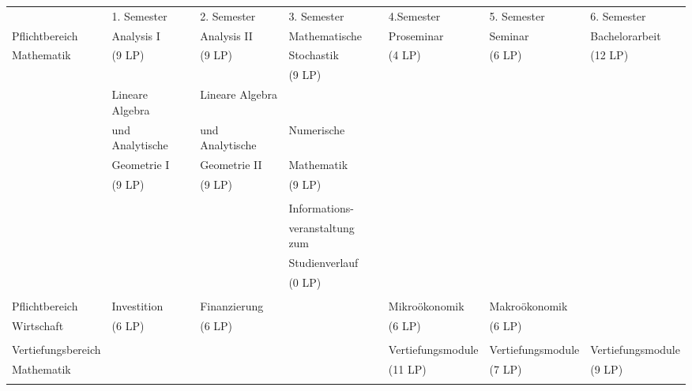 \begin{center}
\begin{tabular}{||l||l|l|l|l|l|l||}
\hhline{|t:=:t:=t=t=t=t=t=:t|}
\hspace*{25mm}&1. Semester\hspace*{8ex}&2. Semester\hspace*{8ex}&3. Semester\hspace*{8ex}&4.Semester\hspace*{8ex}&5. Semester\hspace*{8ex}&6. Semester\hspace*{8ex}\\
\hhline{|:=::======:|} Pflichtbereich&Analysis I&Analysis II&Mathematische& Proseminar &Seminar& Bachelorarbeit\\
\hhline{||~||~|~|~|~|~|~||} Mathematik &(9 LP)&(9 LP)&Stochastik&(4 LP) &(6 LP)& (12 LP)\\
\hhline{||~||~|~|~|~|~|~||} &&&(9 LP)&&&\\
\hhline{||~||~|~|~|~|~|~||} &Lineare Algebra&Lineare Algebra&&&&\\
\hhline{||~||~|~|~|~|~|~||} &und Analytische &und Analytische&Numerische& & &\\
\hhline{||~||~|~|~|~|~|~||} &Geometrie I&Geometrie II&Mathematik&&&\\
\hhline{||~||~|~|~|~|~|~||} &(9 LP)&(9 LP)&(9 LP)&&&\\
\hhline{||~||~|~|~|~|~|~||} &&&&&&\\
\hhline{||~||~|~|~|~|~|~||} &&& Informations- &&&\\
\hhline{||~||~|~|~|~|~|~||} &&& veranstaltung zum &&&\\
\hhline{||~||~|~|~|~|~|~||} &&& Studienverlauf &&&\\
\hhline{||~||~|~|~|~|~|~||} &&& (0 LP) &&&\\
\hhline{||~||~|~|~|~|~|~||} &&&&&&\\
\hhline{|:=::======:|} Pflichtbereich&Investition&Finanzierung&&Mikroökonomik&Makroökonomik&\\
\hhline{||~||~|~|~|~|~|~||} Wirtschaft  &  (6 LP)  &(6 LP) &   &(6 LP) &  (6 LP)  &\\
\hhline{||~||~|~|~|~|~|~||} &&&&&&\\
\hhline{|:=::======:|} Vertiefungsbereich&&&&Vertiefungsmodule&Vertiefungsmodule&Vertiefungsmodule \\
\hhline{||~||~|~|~|~|~|~||} Mathematik&&&&(11 LP)&(7 LP)&(9 LP)\\
\hhline{||~||~|~|~|~|~|~||} &&&&&&\\

\end{tabular}
\end{center}

